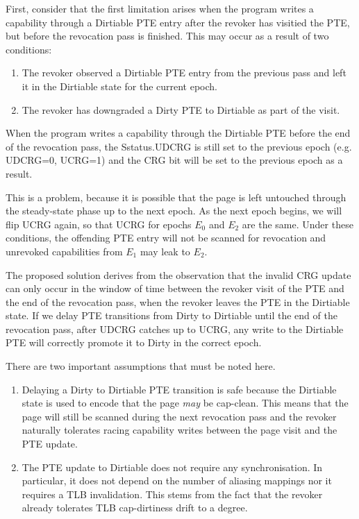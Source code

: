 First, consider that the first limitation arises when the program writes a
capability through a Dirtiable PTE entry after the revoker has visitied the PTE,
but before the revocation pass is finished.
This may occur as a result of two conditions:
\begin{enumerate}
\item The revoker observed a Dirtiable PTE entry from the previous pass and
  left it in the Dirtiable state for the current epoch.
\item The revoker has downgraded a Dirty PTE to Dirtiable as part of the visit.
\end{enumerate}

When the program writes a capability through the Dirtiable PTE before the end of
the revocation pass, the Sstatus.UDCRG is still set to the previous epoch
(e.g. UDCRG=0, UCRG=1) and the CRG bit will be set to the previous epoch
as a result.

This is a problem, because it is possible that the page is left untouched through
the steady-state phase up to the next epoch. As the next epoch begins, we will
flip UCRG again, so that UCRG for epochs $E_0$ and $E_2$ are the same.
Under these conditions, the offending PTE entry will not be scanned for
revocation and unrevoked capabilities from $E_1$ may leak to $E_2$.

The proposed solution derives from the observation that the invalid CRG update
can only occur in the window of time between the revoker visit of the PTE and
the end of the revocation pass, when the revoker leaves the PTE in the
Dirtiable state.
If we delay PTE transitions from Dirty to Dirtiable until the end of the
revocation pass, after UDCRG catches up to UCRG, any write to the Dirtiable PTE
will correctly promote it to Dirty in the correct epoch.

There are two important assumptions that must be noted here.
\begin{enumerate}
\item Delaying a Dirty to Dirtiable PTE transition is safe because the Dirtiable
  state is used to encode that the page \textit{may} be cap-clean. This means
  that the page will still be scanned during the next revocation pass and the
  revoker naturally tolerates racing capability writes between the page visit
  and the PTE update.
\item The PTE update to Dirtiable does not require any synchronisation. In
  particular, it does not depend on the number of aliasing mappings nor it
  requires a TLB invalidation. This stems from the fact that the revoker already
  tolerates TLB cap-dirtiness drift to a degree.
\end{enumerate}

